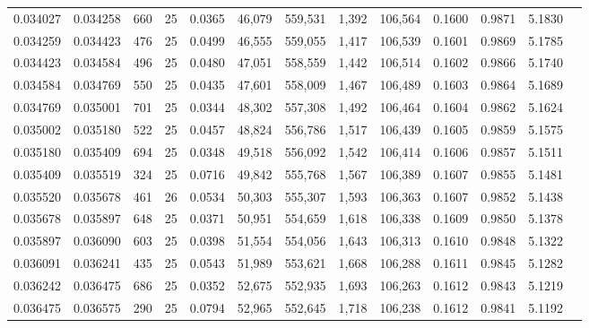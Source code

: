 \begin{tabular}{rrrrrrrrrrrrr}
0.034027 & 0.034258 &   660 &  25 &                                     0.0365 &  46,079 & 559,531 &   1,392 & 106,564 & 0.1600 & 0.9871 & 5.1830 \\
0.034259 & 0.034423 &   476 &  25 &                                     0.0499 &  46,555 & 559,055 &   1,417 & 106,539 & 0.1601 & 0.9869 & 5.1785 \\
0.034423 & 0.034584 &   496 &  25 &                                     0.0480 &  47,051 & 558,559 &   1,442 & 106,514 & 0.1602 & 0.9866 & 5.1740 \\
0.034584 & 0.034769 &   550 &  25 &                                     0.0435 &  47,601 & 558,009 &   1,467 & 106,489 & 0.1603 & 0.9864 & 5.1689 \\
0.034769 & 0.035001 &   701 &  25 &                                     0.0344 &  48,302 & 557,308 &   1,492 & 106,464 & 0.1604 & 0.9862 & 5.1624 \\
0.035002 & 0.035180 &   522 &  25 &                                     0.0457 &  48,824 & 556,786 &   1,517 & 106,439 & 0.1605 & 0.9859 & 5.1575 \\
0.035180 & 0.035409 &   694 &  25 &                                     0.0348 &  49,518 & 556,092 &   1,542 & 106,414 & 0.1606 & 0.9857 & 5.1511 \\
0.035409 & 0.035519 &   324 &  25 &                                     0.0716 &  49,842 & 555,768 &   1,567 & 106,389 & 0.1607 & 0.9855 & 5.1481 \\
0.035520 & 0.035678 &   461 &  26 &                                     0.0534 &  50,303 & 555,307 &   1,593 & 106,363 & 0.1607 & 0.9852 & 5.1438 \\
0.035678 & 0.035897 &   648 &  25 &                                     0.0371 &  50,951 & 554,659 &   1,618 & 106,338 & 0.1609 & 0.9850 & 5.1378 \\
0.035897 & 0.036090 &   603 &  25 &                                     0.0398 &  51,554 & 554,056 &   1,643 & 106,313 & 0.1610 & 0.9848 & 5.1322 \\
0.036091 & 0.036241 &   435 &  25 &                                     0.0543 &  51,989 & 553,621 &   1,668 & 106,288 & 0.1611 & 0.9845 & 5.1282 \\
0.036242 & 0.036475 &   686 &  25 &                                     0.0352 &  52,675 & 552,935 &   1,693 & 106,263 & 0.1612 & 0.9843 & 5.1219 \\
0.036475 & 0.036575 &   290 &  25 &                                     0.0794 &  52,965 & 552,645 &   1,718 & 106,238 & 0.1612 & 0.9841 & 5.1192 \\

\end{tabular}
